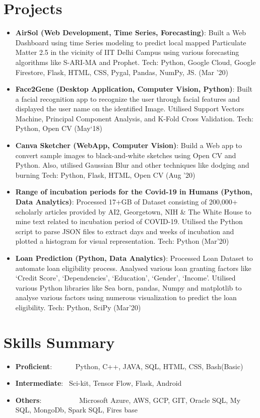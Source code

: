 \documentclass[a4paper,20pt]{article}
\newcommand{\resumeItem}[2]{
  \item\small{
    \textbf{#1}{: #2 \vspace{-2pt}}
  }
}
\newcommand{\resumeSubItem}[2]{\resumeItem{#1}{#2}\vspace{-3pt}}
\newcommand{\resumeSubHeadingListStart}{\begin{itemize}[leftmargin=*]}
\newcommand{\resumeSubHeadingListEnd}{\end{itemize}}
\begin{document}
\vspace{-5pt}
\section{Projects}
\resumeSubHeadingListStart
\resumeSubItem{AirSol (Web Development, Time Series, Forecasting)}{Built a Web Dashboard using time Series modeling to predict local mapped Particulate Matter 2.5 in the vicinity of IIT Delhi Campus using various forecasting algorithms like S-ARI-MA and Prophet. Tech: Python, Google Cloud, Google Firestore, Flask, HTML, CSS, Pygal, Pandas, NumPy, JS. (Mar '20)}
\vspace{2pt}
\resumeSubItem{Face2Gene (Desktop Application, Computer Vision, Python)}{Built a facial recognition app to recognize the user through facial features and displayed the user name on the identified Image. Utilised Support Vectors Machine, Principal Component Analysis, and K-Fold Cross Validation. Tech: Python, Open CV (May`18)}
\vspace{2pt}
\resumeSubItem{Canva Sketcher (WebApp, Computer Vision)}{Build a Web app to convert sample images to black-and-white sketches using Open CV and Python. Also, utilised Gaussian Blur and  other techniques like dodging and burning Tech: Python, Flask, HTML, Open CV (Aug '20)}
\vspace{2pt}
\resumeSubItem{Range of incubation periods for the Covid-19 in Humans (Python, Data Analytics)}{Processed 17+GB of Dataset consisting of 200,000+ scholarly articles provided by AI2, Georgetown, NIH \& The White House to mine text related to incubation period of COVID-19. Utilised the Python script to parse JSON files to extract days and weeks of incubation and plotted a histogram for visual representation. Tech: Python (Mar'20)}
\vspace{2pt}
\resumeSubItem{Loan Prediction (Python, Data Analytics)}{Processed Loan Dataset to automate loan eligibility process. Analysed various loan granting factors like `Credit Score', `Dependencies', `Education', `Gender', `Income'. Utilised various Python libraries like Sea born, pandas, Numpy and matplotlib to analyse various factors using numerous visualization to predict the loan eligibility. Tech: Python, SciPy (Mar'20)}
\resumeSubHeadingListEnd
\vspace{-5pt}


\section{Skills Summary}
	\resumeSubHeadingListStart
	\resumeSubItem{Proficient}{~~~~~~Python, C++, JAVA, SQL, HTML, CSS, Bash(Basic)}
	\resumeSubItem{Intermediate}{~Sci-kit, Tensor Flow, Flask, Android }
	\resumeSubItem{Others}{~~~~~~~~~~Microsoft Azure, AWS, GCP, GIT, Oracle SQL, My SQL, MongoDb, Spark SQL, Fires base}
	\resumeSubHeadingListEnd
\vspace{-5pt}
\end{document}
